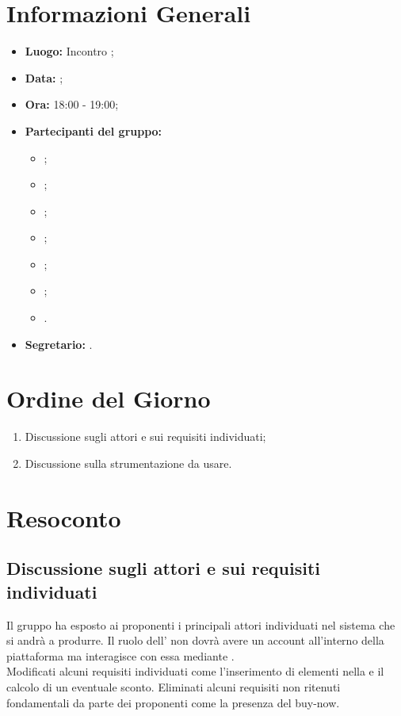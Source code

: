 \section{Informazioni Generali}
\begin{itemize}
\item \textbf{Luogo:} Incontro ;
\item \textbf{Data:} \Data;
\item \textbf{Ora:} 18:00 - 19:00;
\item \textbf{Partecipanti del gruppo:}
	\begin{itemize}
		\item \BL{}; 
		\item \FF{};
		\item \MM{}; 
		\item \PC{};
		\item \TG{};
		\item \TL{};
		\item \VD{}.
	\end{itemize} 
\item \textbf{Segretario:} \PC{}.
\end{itemize}

\section{Ordine del Giorno}
\begin{enumerate}
	\item Discussione sugli attori e sui requisiti individuati;
	\item Discussione sulla strumentazione da usare.
\end{enumerate}

\section{Resoconto}
\subsection{Discussione sugli attori e sui requisiti individuati}
Il gruppo ha esposto ai proponenti i principali attori individuati nel sistema che si andrà a produrre. Il ruolo dell' non dovrà avere un account all'interno della piattaforma ma interagisce con essa mediante .\\
Modificati alcuni requisiti individuati come l'inserimento di elementi nella  e il calcolo di un eventuale sconto. Eliminati alcuni requisiti non ritenuti fondamentali da parte dei proponenti come la presenza del buy-now.

